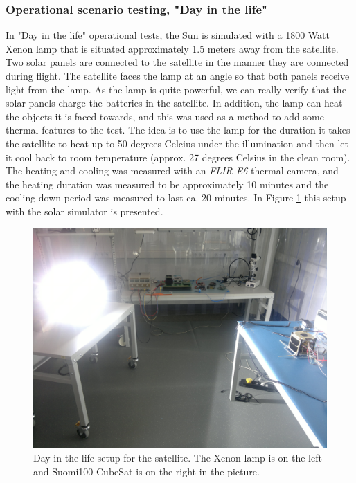 \documentclass[english,12pt,a4paper,pdftex,elec,utf8]{aaltothesis}
\begin{document}
\subsubsection{Operational scenario testing, "Day in the life"}
In "Day in the life" operational tests, the Sun is simulated with a %
1800 Watt Xenon lamp that is situated approximately 1.5 meters away from the satellite. Two solar panels are connected to the satellite in the manner they are connected during flight. The satellite faces the lamp at an angle so that both panels receive light from the lamp. As the lamp is quite powerful, we can really verify that the solar panels charge the batteries in the satellite. In addition, the lamp can heat the objects it is faced towards, and this was used as a method to add some thermal features to the test. The idea is to use the lamp for the duration it takes the satellite to heat up to 50 degrees Celcius under the illumination and then let it cool back to room temperature (approx. 27 degrees Celsius in the clean room). The heating and cooling was measured with an \textit{FLIR E6} thermal camera, and the heating duration was measured to be approximately 10 minutes and the cooling down period was measured to last ca. 20 minutes.
In Figure \ref{dayinlife1} this setup with the solar simulator is presented.\par
\begin{figure}[h!]
\centering
\includegraphics[scale=0.3]{daysetuplamp2}
\caption{Day in the life setup for the satellite. The Xenon lamp is on the left and Suomi100 CubeSat is on the right in the picture.}
\label{dayinlife1}
\end{figure} 
\end{document}
